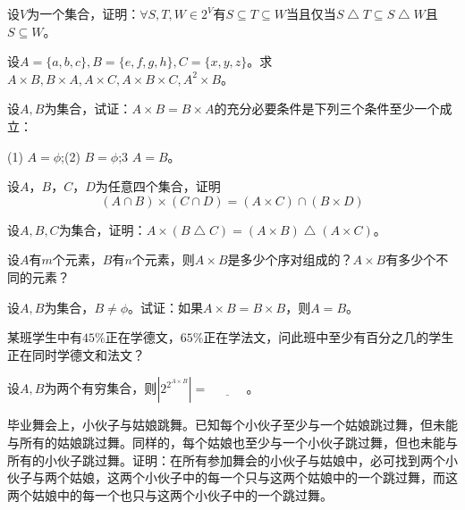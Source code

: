\documentclass{article}
\begin{document}
\begin{CJK}{UTF8}{gbsn}
\begin{Exercise}
  设$V$为一个集合，证明：$\forall S,T,W \in 2^V$有$S \subseteq T \subseteq W$当且仅当$S \bigtriangleup T \subseteq S \bigtriangleup W$且$S \subseteq W$。
\end{Exercise}

\begin{Exercise}
  设$A=\{a,b,c\}, B=\{e,f,g,h\}, C=\{x,y,z\}$。求$A\times B, B\times A, A\times C, A\times B \times C, A^2\times B$。
\end{Exercise}

\begin{Exercise}
  设$A,B$为集合，试证：$A\times B= B\times A$的充分必要条件是下列三个条件至少一个成立：

  (1) $A=\phi$;(2) $B=\phi$;3 $A=B$。
\end{Exercise}

\begin{Exercise}
  设$A$，$B$，$C$，$D$为任意四个集合，证明
  \[(A\cap B) \times (C \cap D) = (A\times C)\cap (B \times D)\]
\end{Exercise}

\begin{Exercise}
  设$A,B,C$为集合，证明：$A\times(B\bigtriangleup C) = (A\times B)\bigtriangleup(A\times C)$。
\end{Exercise}

\begin{Exercise}
  设$A$有$m$个元素，$B$有$n$个元素，则$A\times B$是多少个序对组成的？$A\times B$有多少个不同的元素？
\end{Exercise}

\begin{Exercise}
  设$A,B$为集合，$B\neq \phi$。试证：如果$A\times B= B\times B$，则$A=B$。
\end{Exercise}

\begin{Exercise}
  某班学生中有$45\%$正在学德文，$65\%$正在学法文，问此班中至少有百分之几的学生正在同时学德文和法文？
\end{Exercise}

\begin{Exercise}
  设$A,B$为两个有穷集合，则$|2^{2^{A\times B}}|=\underline{\quad\quad\quad}$。
\end{Exercise}

\begin{Exercise}
  毕业舞会上，小伙子与姑娘跳舞。已知每个小伙子至少与一个姑娘跳过舞，但未能与所有的姑娘跳过舞。同样的，每个姑娘也至少与一个小伙子跳过舞，但也未能与所有的小伙子跳过舞。证明：在所有参加舞会的小伙子与姑娘中，必可找到两个小伙子与两个姑娘，这两个小伙子中的每一个只与这两个姑娘中的一个跳过舞，而这两个姑娘中的每一个也只与这两个小伙子中的一个跳过舞。
\end{Exercise}
\end{CJK}
\end{document}
